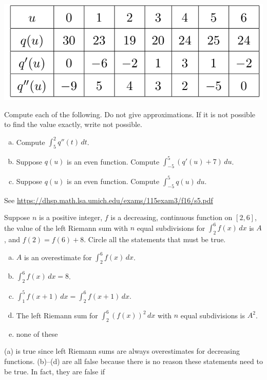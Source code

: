 \documentclass[11pt]{exam}
\begin{document}
\begin{questions}
\begin{center}
  \includegraphics[scale=0.5]{Figures/tableq}
\end{center}
Compute each of the following. Do not give approximations. If it is not possible to find the value exactly, write not possible.
\begin{enumerate}[(a)]
	\item Compute $\displaystyle\int_5^2 q''(t) \, dt$.
	\item Suppose $q(u)$ is an even function. Compute $\displaystyle\int_{-5}^5 (q'(u)+7) \, du$.
	\item Suppose $q(u)$ is an even function. Compute $\displaystyle\int_{-5}^5 q(u) \, du$.
\end{enumerate}
\begin{solution}
  See \href{https://dhsp.math.lsa.umich.edu/exams/115exam3/f16/s5.pdf}{https://dhsp.math.lsa.umich.edu/exams/115exam3/f16/s5.pdf}
\end{solution}
\pagebreak
\question Suppose $n$ is a positive integer, $f$ is a decreasing, continuous function on $[2,6]$, the value of the left Riemann sum with $n$ equal subdivisions for $\displaystyle\int_2^6 f(x) \, dx$ is $A$, and $f(2)=f(6)+8$. Circle all the statements that must be true.
\begin{enumerate}[(a)]
	\item $A$ is an overestimate for $\displaystyle\int_2^6 f(x) \, dx$.
	\item $\displaystyle\int_2^6 f(x) \, dx=8$.
	\item $\displaystyle\int_1^5 f(x+1) \, dx = \displaystyle\int_2^6 f(x+1) \, dx$.
	\item The left Riemann sum for $\displaystyle\int_2^6 (f(x))^2 \, dx$ with $n$ equal subdivisions is $A^2$.
	\item none of these
\end{enumerate}
\begin{solution}
  (a) is true since left Riemann sums are always overestimates for
  decreasing functions. (b)--(d) are all false because there is no
  reason these statements need to be true. In fact, they are false if

\end{solution}
\end{questions}
\end{document}
